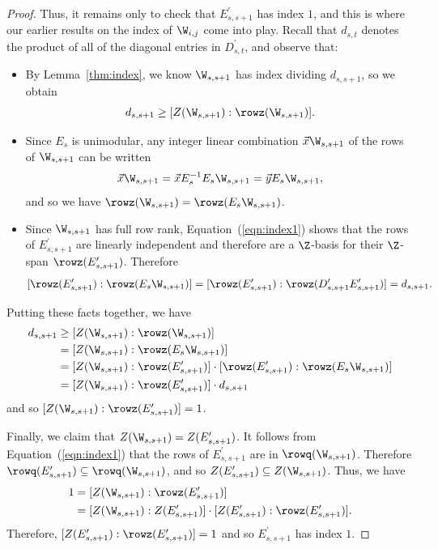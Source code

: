 \begin{proof}
Thus, it remains only to check that $E_{s,s+1}^{\prime}$ has index $1$, and this is where our earlier results on the index of $\W_{i,j}$ come into play.  Recall that $d_{s,t}$ denotes the product of all of the diagonal entries in $D_{s,t}^{\prime}$, and observe that:
\begin{itemize}
\item By Lemma~\ref{thm:index}, we know $\W_{s,s+1}$ has index dividing $d_{s,s+1}$, so we obtain 
\[ d_{s,s+1} \geq [Z(\W_{s,s+1}) : \rowz(\W_{s,s+1})]. \]

\item Since $E_{s}$ is unimodular, any integer linear combination $\vec{x}\W_{s,s+1}$ of the rows of $\W_{s,s+1}$ can be written
\[
\vec{x}\W_{s,s+1} = \vec{x}E_{s}^{-1} E_{s}\W_{s,s+1} = \vec{y}E_{s}\W_{s,s+1},
\]
and so we have $\rowz(\W_{s,s+1}) = \rowz(E_{s}\W_{s,s+1})$. 

\item Since $\W_{s,s+1}$ has full row rank, Equation~(\ref{eqn:index1}) shows that the rows of $E_{s,s+1}^{\prime}$ are linearly independent and therefore are a $\Z$-basis for their $\Z$-span $\rowz(E_{s,s+1}^{\prime})$.  Therefore 
\[ [\rowz(E_{s,s+1}^{\prime}) : \rowz(E_{s}\W_{s,s+1})] = [\rowz(E_{s,s+1}^{\prime}) : \rowz(D_{s,s+1}^{\prime} E_{s,s+1}^{\prime})] = d_{s,s+1}. \]
\end{itemize}
Putting these facts together, we have
\begin{align*}
    d_{s,s+1} &\geq [Z(\W_{s,s+1}) : \rowz(\W_{s,s+1})]\\
    &= [Z(\W_{s,s+1}) : \rowz(E_{s}\W_{s,s+1})]\\
    &= [Z(\W_{s,s+1}) : \rowz(E_{s,s+1}^{\prime})] \cdot [\rowz(E_{s,s+1}^{\prime}) : \rowz(E_{s}\W_{s,s+1})]\\
    &= [Z(\W_{s,s+1}) : \rowz(E_{s,s+1}^{\prime})] \cdot d_{s,s+1}
\end{align*}
and so $[Z(\W_{s,s+1}) : \rowz(E_{s,s+1}^{\prime})]=1$.

Finally, we claim that $Z(\W_{s,s+1}) = Z(E_{s,s+1}^{\prime})$.  It follows from Equation~(\ref{eqn:index1}) that the rows of $E_{s,s+1}^{\prime}$ are in $\rowq(\W_{s,s+1})$.  Therefore $\rowq(E_{s,s+1}^{\prime}) \subseteq \rowq(\W_{s,s+1})$, and so $Z(E_{s,s+1}^{\prime}) \subseteq Z(\W_{s,s+1})$.
Thus, we have
\begin{align*}
1 &= [Z(\W_{s,s+1}) : \rowz(E_{s,s+1}^{\prime})]\\
&= [Z(\W_{s,s+1}) : Z(E_{s,s+1}^{\prime})] \cdot [Z(E_{s,s+1}^{\prime}) : \rowz(E_{s,s+1}^{\prime})].
\end{align*}
Therefore, $[Z(E_{s,s+1}^{\prime}) : \rowz(E_{s,s+1}^{\prime})]=1$ and so $E_{s,s+1}^{\prime}$ has index $1$.
\end{proof}

